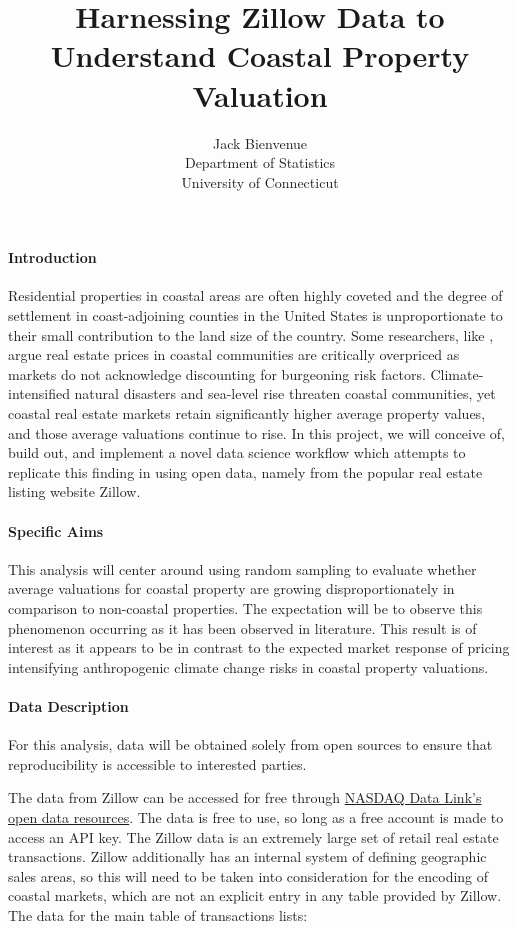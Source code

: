\documentclass[12pt]{article}
\title{Harnessing Zillow Data to Understand Coastal Property Valuation}
\author{Jack Bienvenue\\
  Department of Statistics\\
  University of Connecticut
}
\begin{document}
\maketitle


\paragraph{Introduction}

Residential properties in coastal areas are often highly coveted and the degree of settlement in coast-adjoining counties in the United States is unproportionate to their small contribution to the land size of the country. \citep{landry2022hedonic} Some researchers, like \citet{gourevitch2023unpriced}, argue real estate prices in coastal communities are critically overpriced as markets do not acknowledge discounting for burgeoning risk factors. Climate-intensified natural disasters and sea-level rise threaten coastal communities, yet coastal real estate markets retain significantly higher average property values, and those average valuations continue to rise. \citep{McNamara2024} In this project, we will conceive of, build out, and implement a novel data science workflow which attempts to replicate this finding in \citet{McNamara2024} using open data, namely from the popular real estate listing website Zillow. 


\paragraph{Specific Aims}

This analysis will center around using random sampling to evaluate whether average valuations for coastal property are growing disproportionately in comparison to non-coastal properties. The expectation will be to observe this phenomenon occurring as it has been observed in literature. \citep{McNamara2024} This result is of interest as it appears to be in contrast to the expected market response of pricing intensifying anthropogenic climate change risks in coastal property valuations. \citep{fuerst2021pricing}

\paragraph{Data Description}

For this analysis, data will be obtained solely from open sources to ensure that reproducibility is accessible to interested parties. 

The data from Zillow can be accessed for free through \href{https://data.nasdaq.com/}{NASDAQ Data Link's open data resources}. The data is free to use, so long as a free account is made to access an API key. The Zillow data is an extremely large set of retail real estate transactions. Zillow additionally has an internal system of defining geographic sales areas, so this will need to be taken into consideration for the encoding of coastal markets, which are not an explicit entry in any table provided by Zillow. The data for the main table of transactions lists:
\end{document}
